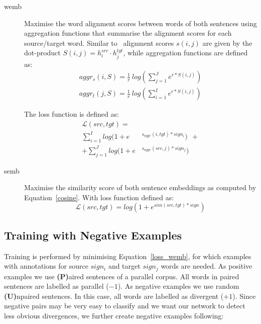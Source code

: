 \documentclass[11pt,a4paper]{article}
\begin{document}
\begin{description}
    \item[wemb] 
 
Maximise the word alignment scores between words of both sentences using aggregation functions that summarise the alignment scores for each source/target word. 
Similar to~\cite{W16-2207} alignment scores $s(i,j)$ are given by the dot-product $S(i,j) = h_i^{src} \cdotp h_j^{tgt}$, while aggregation functions are defined as:   
\begin{equation}
\begin{split}
    aggr_s(i,S) = \frac{1}{r} \ log \left( \displaystyle \sum_{j=1}^{J} e^{r * S(i,j)}\right) \\
    aggr_t(j,S) = \frac{1}{r} \ log \left( \displaystyle \sum_{i=1}^{I} e^{r * S(i,j)}\right)
\end{split}
\label{aggregation}
\end{equation}


The loss function is defined as:
\begin{equation}
\begin{split}
\mathcal{L}(src,tgt) = \ \ \ \ & \\
    \sum_{i=1}^I log(1+e&^{s_{aggr}(i,tgt) * sign_i}) \ \ +\\
 + \sum_{j=1}^J log(1+e&^{s_{aggr}(src,j) * sign_j})
\end{split}
\label{loss_wemb}
\end{equation}


    \item[semb] Maximise the similarity score of  both sentence embeddings as computed by Equation~\ref{cosine}. With loss function defined as: 
\begin{equation}
\mathcal{L}(src,tgt) = log(1+e^{sim(src,tgt) * sign}) %
\label{loss_semb}
\end{equation}

\end{description}

\subsection{Training with Negative Examples}
\label{negative}

Training is performed by minimising Equation~\ref{loss_wemb}, for which examples with annotations for source $sign_i$ and target $sign_j$ words are needed.
As positive examples we use {\bf (P)}aired sentences of a parallel corpus. All words in paired sentences are labelled as parallel ($-1$). %
As negative examples we use random {\bf (U)}npaired sentences. 
In this case, all words are labelled as divergent ($+1$). %
Since negative pairs may be very easy to classify and we want our network to detect less obvious divergences, we further create negative examples following: %
\end{document}
